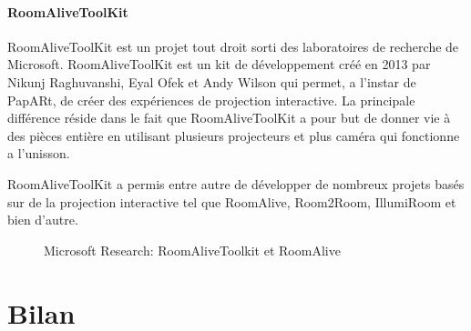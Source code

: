 \paragraph{RoomAliveToolKit} RoomAliveToolKit\cite{Jones:2014:RME:2642918.2647383} est un projet tout droit sorti des laboratoires de recherche de Microsoft. RoomAliveToolKit est un kit de développement créé en 2013 par Nikunj Raghuvanshi, Eyal Ofek et Andy Wilson qui permet, a l'instar de PapARt, de créer des expériences de projection interactive. La principale différence réside dans le fait que RoomAliveToolKit a pour but de donner vie à des pièces entière en utilisant plusieurs projecteurs et plus caméra qui fonctionne a l'unisson.

RoomAliveToolKit a permis entre autre de développer de nombreux projets basés sur de la projection interactive tel que RoomAlive, Room2Room, IllumiRoom et bien d'autre.

\begin{figure}[H]
    \centering
\caption{Microsoft Research: RoomAliveToolkit et RoomAlive\protect\footnotemark}
\label{fig:roomalive}
\end{figure}



\section{Bilan}